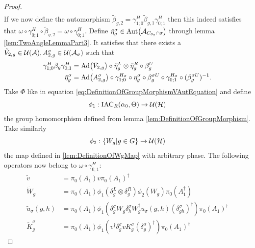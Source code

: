 \documentclass[12pt,a4paper,twoside]{article}
\numberwithin{equation}{section}
\begin{document}
\begin{proof}
\begin{align}
	\end{align}
	If we now define the automorphism $\tilde{\beta}_{g,2}=\gamma^{H}_{1;0}\tilde\beta_{g,1}\gamma^{H}_{0;1}$ then this indeed satisfies that $\omega\circ\gamma^{H}_{0;1}\circ\tilde{\beta}_{g,2}=\omega\circ\gamma^{H}_{0;1}$. Define $\tilde\eta_g^\sigma\in\Aut{\AA_{C_{\theta_2}\cap\sigma}}$ through lemma \ref{lem:TwoAngleLemmaPart3}. It satisfies that there exists a $\tilde V_{2,g}\in\mathcal U(\mathcal A),A_{2,g}^{\sigma}\in\mathcal U(\mathcal A_\sigma)$ such that
	\begin{align}
		\label{eq:IndexInvariantUnderLGAEtaTildeDefiniton1}
		\gamma^{H}_{1;0}\tilde{\beta}_g\gamma^{H}_{0;1}&=\Ad{\tilde V_{2,g}}\circ\tilde{\eta}_g^L\otimes\tilde{\eta}_g^R\circ\beta_g^U\\
		\label{eq:IndexInvariantUnderLGAEtaTildeDefiniton2}
		\tilde{\eta}_g^\sigma&=\Ad{A_{2,g}^\sigma}\circ\gamma^{H_\sigma}_{1;0}\circ\eta_g^\sigma\circ\beta_g^{\sigma U}\circ\gamma^{H_\sigma}_{0;1}\circ(\beta_g^{\sigma U})^{-1}.
	\end{align}
	Take $\Phi$ like in equation \eqref{eq:DefinitionOfGroupMorphismVAutEquation} and define
	\begin{equation}
		\phi_1:\textrm{IAC}_R(\alpha_0,\Theta) \rightarrow \mathcal U(\mathcal H)
	\end{equation}
	the group homomorphism defined from lemma \ref{lem:DefinitionOfGroupMorphism}. Take similarly
	\begin{equation}
		\phi_2:\{W_g|g\in G\}\rightarrow \mathcal U(\mathcal H)
	\end{equation}
	the map defined in \ref{lem:DefinitionOfWgMap} with arbitrary phase. The following operators now belong to $\omega\circ\gamma^{H}_{0;1}:$
	\begin{align}
		\label{eq:IndexInvariantUnderLGANewOperator1}
		\tilde{v}&=\pi_0(A_1)v\pi_0(A_1)^\dagger\\
		\label{eq:IndexInvariantUnderLGANewOperator2}
		\tilde{W}_g&=\pi_0(A_1)\phi_1(\delta^L_g\otimes\delta^R_g)\phi_2( W_g)\pi_0(A_1^\dagger)\\
		\label{eq:IndexInvariantUnderLGANewOperator3}
		\tilde u_\sigma(g,h)&=\pi_0(A_1) \phi_1\left(\delta^\sigma_g W_g\delta^\sigma_h W_g^\dagger u_\sigma(g,h)(\delta^\sigma_{gh})^\dagger\right)\pi_0(A_1)^\dagger\\
		\label{eq:IndexInvariantUnderLGANewOperator4}
		\tilde{K}_g^\sigma&=\pi_0(A_1)\phi_1(v^\dagger \delta_g^\sigma v K_g^\sigma (\delta_g^\sigma)^\dagger) \pi_0(A_1)^\dagger
	\end{align}

\end{proof}
\end{document}
